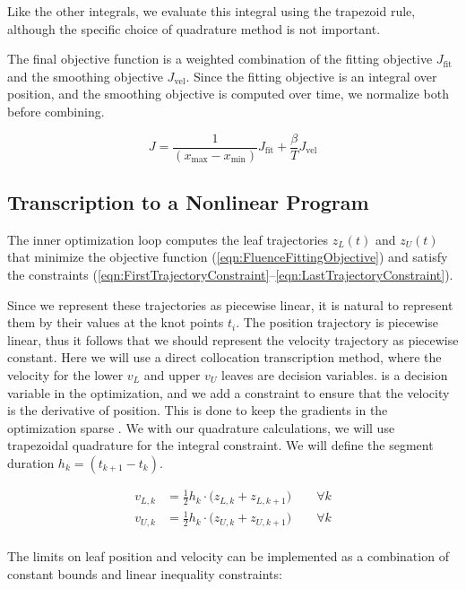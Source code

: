 Like the other integrals, we evaluate this integral using the trapezoid rule,
although the specific choice of quadrature method is not important.

The final objective function is a weighted combination of the
fitting objective $J_\text{fit}$ and the smoothing objective $J_\text{vel}$.
Since the fitting objective is an integral over position, and the smoothing objective
is computed over time, we normalize both before combining.

\begin{equation}
  J = \frac{1}{(x_\text{max} - x_\text{min})} J_\text{fit}
    + \frac{\beta}{T} J_\text{vel}
\label{eqn:FluenceFittingObjective}
\end{equation}

\subsection{Transcription to a Nonlinear Program}

The inner optimization loop computes the leaf trajectories $z_L(t)$ and $z_U(t)$
that minimize the objective function (\ref{eqn:FluenceFittingObjective})
and satisfy the constraints (\ref{eqn:FirstTrajectoryConstraint}--\ref{eqn:LastTrajectoryConstraint}).

Since we represent these trajectories as piecewise linear,
it is natural to represent them by their values at the knot points $t_i$.
The position trajectory is piecewise linear, thus it follows that we should represent the
velocity trajectory as piecewise constant.
Here we will use a direct collocation transcription method, where the velocity for the
lower $v_L$ and upper $v_U$ leaves are decision variables.
is a decision variable in the optimization,
and we add a constraint to ensure that the velocity is the derivative of position.
This is done to keep the gradients in the optimization sparse \cite{Betts2010}.
We with our quadrature calculations, we will use trapezoidal quadrature for the integral constraint.
We will define the segment duration $h_k = (t_{k+1} - t_k)$.

\begin{align}
  v_{L,k} & = \tfrac{1}{2} h_k \cdot  \big( z_{L, k} + z_{L, k+1} \big)
  \quad \quad \forall k\\
  v_{U,k} & = \tfrac{1}{2} h_k \cdot  \big( z_{U, k} + z_{U, k+1} \big)
  \quad \quad \forall k\\
\end{align}

The limits on leaf position and velocity can be implemented as a combination of
constant bounds and linear inequality constraints:

